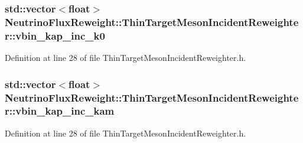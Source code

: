 \hypertarget{class_neutrino_flux_reweight_1_1_thin_target_meson_incident_reweighter_a7091af2d57521ec0ddc249424874cf75}{
\subsubsection[{vbin\-\_\-kap\-\_\-inc\-\_\-k0}]{\setlength{\rightskip}{0pt plus 5cm}std\-::vector$<$float$>$ Neutrino\-Flux\-Reweight\-::\-Thin\-Target\-Meson\-Incident\-Reweighter\-::vbin\-\_\-kap\-\_\-inc\-\_\-k0}}\label{class_neutrino_flux_reweight_1_1_thin_target_meson_incident_reweighter_a7091af2d57521ec0ddc249424874cf75}


Definition at line 28 of file Thin\-Target\-Meson\-Incident\-Reweighter.\-h.

\hypertarget{class_neutrino_flux_reweight_1_1_thin_target_meson_incident_reweighter_a75572bfb96c73d133145b2aed9737be9}{
\subsubsection[{vbin\-\_\-kap\-\_\-inc\-\_\-kam}]{\setlength{\rightskip}{0pt plus 5cm}std\-::vector$<$float$>$ Neutrino\-Flux\-Reweight\-::\-Thin\-Target\-Meson\-Incident\-Reweighter\-::vbin\-\_\-kap\-\_\-inc\-\_\-kam}}\label{class_neutrino_flux_reweight_1_1_thin_target_meson_incident_reweighter_a75572bfb96c73d133145b2aed9737be9}


Definition at line 28 of file Thin\-Target\-Meson\-Incident\-Reweighter.\-h.

